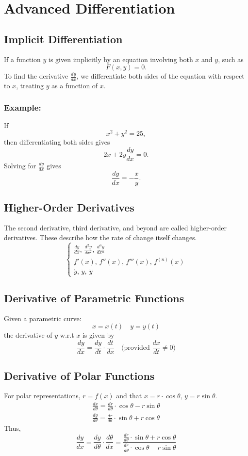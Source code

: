 \documentclass[11pt]{article}
\begin{document}
\section{Advanced Differentiation}
\subsection{Implicit Differentiation}
If a function $y$ is given implicitly by an equation involving both $x$ and $y$, such as
\[
    F(x,y) = 0.
\]
To find the derivative $\displaystyle\frac{dy}{dx}$, we differentiate both sides of the equation with respect to $x$, treating $y$ as a function of $x$.
\subsubsection*{Example:} If
\[
    x^2 + y^2 = 25,
\]
then differentiating both sides gives
\[
    2x + 2y \frac{dy}{dx} = 0.
\]
Solving for $\displaystyle\frac{dy}{dx}$ gives
\[
    \frac{dy}{dx} = -\frac{x}{y}.
\]
\subsection{Higher-Order Derivatives}
The second derivative, third derivative, and beyond are called higher-order derivatives. 
These describe how the rate of change itself changes.
\[
    \begin{cases}
    \displaystyle
        \frac{dy}{dx}, \,
        \frac{d^2y}{dx^2}, \, 
        \frac{d^n y}{dx^n}\\
        f'(x), \, f''(x), \, f'''(x), \, f^{(n)}(x)\\
        \dot{y}, \, \ddot{y}, \, \overset{...}{y}
    \end{cases}
\]
\subsection{Derivative of Parametric Functions}
Given a parametric curve:
\[
    x=x(t)\quad y=y(t)
\]
the derivative of $y$ w.r.t $x$ is given by
\[
    \frac{dy}{dx}=\frac{dy}{dt}\cdot\frac{dt}{dx}\quad \text{(provided } \frac{dx}{dt} \neq 0\text{)}
\]
\subsection{Derivative of Polar Functions}
For polar representations, $r=f(x)$ and that $x=r\cdot\cos\theta, \,y=r\sin\theta$.
\begin{align*}
    \frac{dx}{d\theta}=\frac{dr}{d\theta}\cdot\cos\theta - r\sin\theta\\[.5em]
    \frac{dy}{d\theta}=\frac{dr}{d\theta}\cdot\sin\theta + r\cos\theta
\end{align*} 
Thus,
\[
    \frac{dy}{dx}=\frac{dy}{d\theta}\cdot\frac{d\theta}{dx}=\frac{\frac{dr}{d\theta}\cdot\sin\theta + r\cos\theta}{\frac{dr}{d\theta}\cdot\cos\theta - r\sin\theta}
\]
\end{document}
